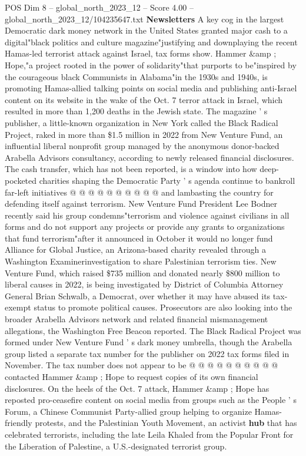 \begin{textsample}{POS Dim 8 – global\_north\_2023\_12 – Score 4.00 – global\_north\_2023\_12/104235647.txt}  \label{ex:f8_pos_276}
\textbf{Newsletters} A key cog in the largest Democratic dark money network in the United States granted major cash to a digital"black politics and culture magazine"justifying and downplaying the recent Hamas-led terrorist attack against Israel, tax forms show.
Hammer \&amp ; Hope,"a project rooted in the power of solidarity"that purports to be"inspired by the courageous black Communists in Alabama"in the 1930s and 1940s, is promoting Hamas-allied talking points on social media and publishing anti-Israel content on its website in the wake of the Oct. 7 terror attack in Israel, which resulted in more than 1,200 deaths in the Jewish state.
The magazine ' s publisher, a little-known organization in New York called the Black Radical Project, raked in more than \$1.5 million in 2022 from New Venture Fund, an influential liberal nonprofit group managed by the anonymous donor-backed Arabella Advisors consultancy, according to newly released financial disclosures.
The cash transfer, which has not been reported, is a window into how deep-pocketed charities shaping the Democratic Party ' s agenda continue to bankroll far-left initiatives @ @ @ @ @ @ @ @ @ @ and lambasting the country for defending itself against terrorism.
New Venture Fund President Lee Bodner recently said his group condemns"terrorism and violence against civilians in all forms and do not support any projects or provide any grants to organizations that fund terrorism"after it announced in October it would no longer fund Alliance for Global Justice, an Arizona-based charity revealed through a Washington Examinerinvestigation to share Palestinian terrorism ties.
New Venture Fund, which raised \$735 million and donated nearly \$800 million to liberal causes in 2022, is being investigated by District of Columbia Attorney General Brian Schwalb, a Democrat, over whether it may have abused its tax-exempt status to promote political causes.
Prosecutors are also looking into the broader Arabella Advisors network and related financial mismanagement allegations, the Washington Free Beacon reported.
The Black Radical Project was formed under New Venture Fund ' s dark money umbrella, though the Arabella group listed a separate tax number for the publisher on 2022 tax forms filed in November.
The tax number does not appear to be @ @ @ @ @ @ @ @ @ @ contacted Hammer \&amp ; Hope to request copies of its own financial disclosures.
On the heels of the Oct. 7 attack, Hammer \&amp ; Hope has reposted pro-ceasefire content on social media from groups such as the People ' s Forum, a Chinese Communist Party-allied group helping to organize Hamas-friendly protests, and the Palestinian Youth Movement, an activist \textbf{hub} that has celebrated terrorists, including the late Leila Khaled from the Popular Front for the Liberation of Palestine, a U.S.-designated terrorist group.

\end{textsample}
